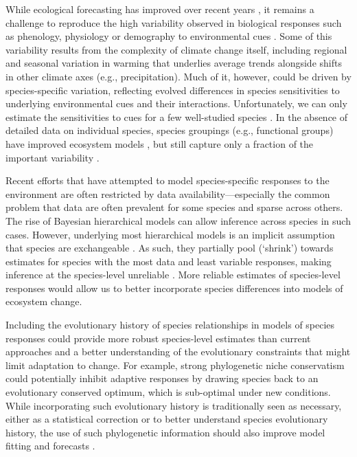 \documentclass{article}
\begin{document}
While ecological forecasting has improved over recent years \citep{dietze2017ecological,lewis2022power}, it remains a challenge to reproduce the high variability observed in biological responses such as phenology, physiology or demography to environmental cues \citep{IPCC:2014sm}. Some of this variability results from the complexity of climate change itself, including regional and seasonal variation in warming that underlies average trends alongside shifts in other climate axes (e.g.,  precipitation). Much of it, however, could be driven by species-specific variation, reflecting evolved differences in species sensitivities to underlying environmental cues and their interactions. Unfortunately, we can only estimate the sensitivities to cues for a few well-studied species \citep{chuinearees,ettinger2020}. In the absence of detailed data on individual species, species groupings (e.g., functional groups) have improved ecosystem models \citep{ed2001,griffith2020}, but still capture only a fraction of the important variability \citep{fuccillo2022}.

Recent efforts that have attempted to model species-specific responses to the environment \citep{diez2012forecasting} are often restricted by data availability---especially the common problem that data are often prevalent for some species and sparse across others. The rise of Bayesian hierarchical models can allow inference across species in such cases. However, underlying most hierarchical models is an implicit assumption that species are exchangeable \citep[all species represent samples drawn from the same underlying distribution,][]{gelman2006}. As such, they partially pool (`shrink') towards estimates for species with the most data and least variable responses, making inference at the species-level unreliable \citep{ettinger2020}. More reliable estimates of species-level responses would allow us to better incorporate species differences into models of ecosystem change. 

Including the evolutionary history of species relationships in models of species responses could provide more robust species-level estimates than current approaches and a better understanding of the evolutionary constraints that might limit adaptation to change. For example, strong phylogenetic niche conservatism \citep{wiens2010niche} could potentially inhibit adaptive responses by drawing species back to an evolutionary conserved optimum, which is sub-optimal under new conditions. While incorporating such evolutionary history is traditionally seen as necessary, either as a statistical correction or to better understand species evolutionary history, the use of such phylogenetic information should also improve model fitting and forecasts \citep{freckleton2002phylogenetic}.
\end{document}
